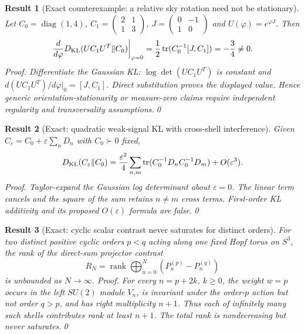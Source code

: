 \documentclass[aps,prd,onecolumn,notitlepage,groupedaddress,11pt]{revtex4-2}
\newtheorem{result}{Result}
\begin{document}
\begin{result}[\textsf{Exact counterexample}: a relative sky rotation need not be stationary]\label{new:238}
Let $C_0=\operatorname{diag}(1,4)$, $C_1=\left(\begin{smallmatrix}2&1\\1&3\end{smallmatrix}\right)$, $J=\left(\begin{smallmatrix}0&-1\\1&0\end{smallmatrix}\right)$ and $U(\varphi)=e^{\varphi J}$. Then
\begin{equation}\label{eq:244-238}
\left.\frac{d}{d\varphi}D_{\rm KL}(UC_1U^T\Vert C_0)\right|_{\varphi=0}=
\frac12\operatorname{tr}(C_0^{-1}[J,C_1])=-\frac34\ne0.
\end{equation}
\textit{Proof.} Differentiate the Gaussian KL: $\log\det(UC_1U^T)$ is constant and $d(UC_1U^T)/d\varphi|_0=[J,C_1]$. Direct substitution proves the displayed value. Hence generic orientation-stationarity or measure-zero claims require independent regularity and transversality assumptions.\qed
\end{result}

\begin{result}[\textsf{Exact}: quadratic weak-signal KL with cross-shell interference]\label{new:239}
Given $C_\varepsilon=C_0+\varepsilon\sum_nD_n$ with $C_0\succ0$ fixed,
\begin{equation}\label{eq:244-239}
D_{\rm KL}(C_\varepsilon\Vert C_0)=\frac{\varepsilon^2}{4}\sum_{n,m}\operatorname{tr}(C_0^{-1}D_nC_0^{-1}D_m)+O(\varepsilon^3).
\end{equation}
\textit{Proof.} Taylor-expand the Gaussian log determinant about $\varepsilon=0$. The linear term cancels and the square of the \emph{sum} retains $n\ne m$ cross terms. First-order KL additivity and its proposed $O(\varepsilon)$ formula are false.\qed
\end{result}

\begin{result}[\textsf{Exact}: cyclic scalar contrast never saturates for distinct orders]\label{new:240}
For two distinct positive cyclic orders $p<q$ acting along one fixed Hopf torus on $S^3$, the rank of the direct-sum projector contrast
\begin{equation}\label{eq:244-240}
R_N=\operatorname{rank}\bigoplus_{n=0}^N(P_n^{(p)}-P_n^{(q)})
\end{equation}
is unbounded as $N\to\infty$. \textit{Proof.} For every $n=p+2k$, $k\ge0$, the weight $w=p$ occurs in the left $SU(2)$ module $V_n$, is invariant under the order-$p$ action but not order $q>p$, and has right multiplicity $n+1$. Thus each of infinitely many such shells contributes rank at least $n+1$. The total rank is nondecreasing but never saturates.\qed
\end{result}
\end{document}

